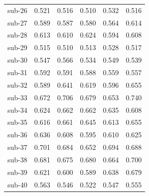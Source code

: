 \begin{table}[t]
\begin{tabular}{lccccc}
sub-26 & 0.521 & 0.516 & 0.510 & 0.532 & 0.516 \\
sub-27 & 0.589 & 0.587 & 0.580 & 0.564 & 0.614 \\
sub-28 & 0.613 & 0.610 & 0.624 & 0.594 & 0.608 \\
sub-29 & 0.515 & 0.510 & 0.513 & 0.528 & 0.517 \\
sub-30 & 0.547 & 0.566 & 0.534 & 0.549 & 0.539 \\
sub-31 & 0.592 & 0.591 & 0.588 & 0.559 & 0.557 \\
sub-32 & 0.589 & 0.641 & 0.619 & 0.596 & 0.655 \\
sub-33 & 0.672 & 0.706 & 0.679 & 0.653 & 0.740 \\
sub-34 & 0.624 & 0.662 & 0.662 & 0.635 & 0.608 \\
sub-35 & 0.616 & 0.661 & 0.645 & 0.613 & 0.655 \\
sub-36 & 0.636 & 0.608 & 0.595 & 0.610 & 0.625 \\
sub-37 & 0.701 & 0.684 & 0.652 & 0.694 & 0.688 \\
sub-38 & 0.681 & 0.675 & 0.680 & 0.664 & 0.700 \\
sub-39 & 0.621 & 0.600 & 0.589 & 0.638 & 0.679 \\
sub-40 & 0.563 & 0.546 & 0.522 & 0.547 & 0.555 \\
\bottomrule
\end{tabular}
\end{table}

